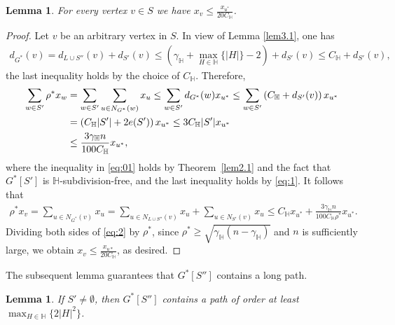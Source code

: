 \documentclass[11pt, a4paper]{article}
\newtheorem{lemma}[theorem]{Lemma}
\theoremstyle{definition}
\newcommand{\<}{\subseteq}
\newcommand{\red}[1]{\textcolor[rgb]{1.00,0.00,0.00}{#1}}
\begin{document}
\begin{lemma}\label{lem3.2}
    For every vertex  $v\in S$ we have $x_v\leq\frac{x_{u^*}}{20C_\mathbb{H}}$.
\end{lemma}
  \begin{proof}
  Let $v$ be an arbitrary vertex in $S$. 
In view of Lemma \ref{lem3.1}, one has 
    \begin{align*}
        d_{G^*}(v)=d_{L\cup S''}(v)+d_{S'}(v)\leq(\gamma_\mathbb{H}+\max_{H\in \mathbb{H}}\{|H|\}-2)+d_{S'}(v)\leq C_\mathbb{H}+d_{S'}(v),
    \end{align*}
    the last inequality holds by the choice of $C_\mathbb{H}$. 
    Therefore,  
    \begin{align}\notag
    \sum_{w\in S'}\rho^*x_w&=\sum_{w\in S'}\sum_{u\in N_{G^*}(w)}x_u\leq \sum_{w\in S'}d_{G^*}(w)x_{u^*}\leq \sum_{w\in S'}\left(C_\mathbb{H}+d_{S'}(v)\right)x_{u^*}\\\label{eq:01}
        &=\left(C_\mathbb{H}|S'|+2e(S')\right)x_{u^*}\leq 3C_\mathbb{H}|S'|x_{u^*}\\\notag
        &\leq \frac{3\gamma_\mathbb{H}n}{100C_\mathbb{H}}x_{u^*},
    \end{align}
    where the inequality in  \eqref{eq:01} holds by Theorem~\ref{lem2.1} and the fact that $G^*[S']$ is $\mathbb{H}$-subdivision-free, and the last inequality holds by \eqref{eq:1}.  
    It follows that  
\begin{align}\label{eq:2}
        \rho^*x_v=\underset{u\in N_{G^*}(v)}{\sum}x_u=\underset{u\in N_{L\cup S''}(v)}{\sum}x_u+\underset{u\in N_{S'}(v)}{\sum}x_u\leq C_\mathbb{H}x_{u^*}+\frac{3\gamma_\mathbb{H}n}{100C_\mathbb{H}\rho^*}x_{u^*}.
    \end{align}
    Dividing both sides of \eqref{eq:2} by $\rho^*$, since ${\rho^*}\geq\sqrt{\gamma_\mathbb{H}(n-\gamma_\mathbb{H})}$ and $n$ is sufficiently large, we obtain $x_v\leq\frac{x_{u*}}{20C_\mathbb{H}}$, as desired.
  \end{proof}
The subsequent lemma guarantees that $G^*[S'']$ contains a long path. 
\begin{lemma}\label{lem3.3}
If $S'\neq \emptyset$, then %
$G^*[S'']$ contains a path of order at least $\max_{H\in \mathbb{H}}\{2|H|^2\}$.%
\end{lemma}
\end{document}
